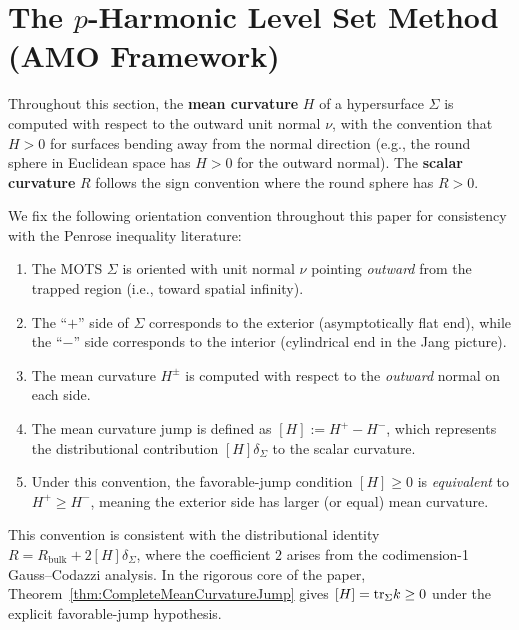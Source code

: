 \section{The \texorpdfstring{$p$}{p}-Harmonic Level Set Method (AMO Framework)}
\label{sec:AMO}

\begin{remark}
Throughout this section, the \textbf{mean curvature} $H$ of a hypersurface $\Sigma$ is computed with respect to the outward unit normal $\nu$, with the convention that $H > 0$ for surfaces bending away from the normal direction (e.g., the round sphere in Euclidean space has $H > 0$ for the outward normal). The \textbf{scalar curvature} $R$ follows the sign convention where the round sphere has $R > 0$.
\end{remark}

\begin{remark}\label{rem:OrientationConvention}
We fix the following orientation convention throughout this paper for consistency with the Penrose inequality literature:
\begin{enumerate}
    \item The MOTS $\Sigma$ is oriented with unit normal $\nu$ pointing \emph{outward} from the trapped region (i.e., toward spatial infinity).
    \item The ``$+$'' side of $\Sigma$ corresponds to the exterior (asymptotically flat end), while the ``$-$'' side corresponds to the interior (cylindrical end in the Jang picture).
    \item The mean curvature $H^\pm$ is computed with respect to the \emph{outward} normal on each side.
    \item The mean curvature jump is defined as $[H] := H^+ - H^-$, which represents the distributional contribution $[H] \delta_\Sigma$ to the scalar curvature.
    \item Under this convention, the favorable-jump condition $[H] \geq 0$ is \emph{equivalent} to $H^+ \geq H^-$, meaning the exterior side has larger (or equal) mean curvature.
\end{enumerate}
This convention is consistent with the distributional identity $R = R_{\text{bulk}} + 2[H]\delta_\Sigma$, where the coefficient $2$ arises from the codimension-1 Gauss--Codazzi analysis. In the rigorous core of the paper, Theorem~\ref{thm:CompleteMeanCurvatureJump} gives $[H]=\mathrm{tr}_\Sigma k \ge 0$ under the explicit favorable-jump hypothesis.
\end{remark}

